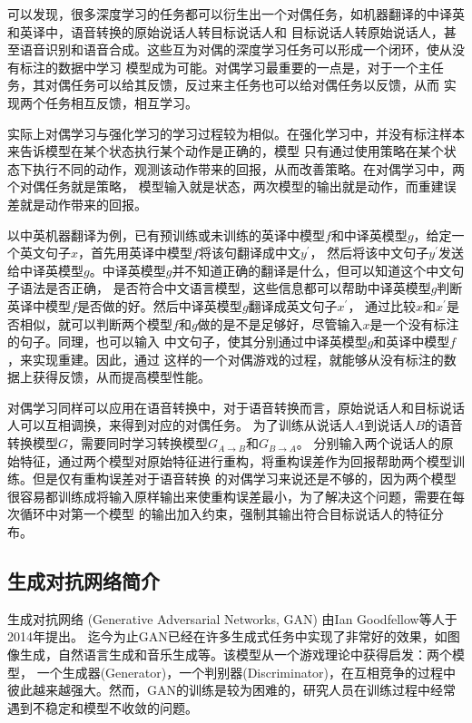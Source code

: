 可以发现，很多深度学习的任务都可以衍生出一个对偶任务，如机器翻译的中译英和英译中，语音转换的原始说话人转目标说话人和
目标说话人转原始说话人，甚至语音识别和语音合成。这些互为对偶的深度学习任务可以形成一个闭环，使从没有标注的数据中学习
模型成为可能。对偶学习最重要的一点是，对于一个主任务，其对偶任务可以给其反馈，反过来主任务也可以给对偶任务以反馈，从而
实现两个任务相互反馈，相互学习。

实际上对偶学习与强化学习的学习过程较为相似。在强化学习中，并没有标注样本来告诉模型在某个状态执行某个动作是正确的，模型
只有通过使用策略在某个状态下执行不同的动作，观测该动作带来的回报，从而改善策略。在对偶学习中，两个对偶任务就是策略，
模型输入就是状态，两次模型的输出就是动作，而重建误差就是动作带来的回报。

以中英机器翻译为例，已有预训练或未训练的英译中模型$f$和中译英模型$g$，给定一个英文句子$x$，首先用英译中模型$f$将该句翻译成中文$y^{'}$，
然后将该中文句子$y^{'}$发送给中译英模型$g$。中译英模型$g$并不知道正确的翻译是什么，但可以知道这个中文句子语法是否正确，
是否符合中文语言模型，这些信息都可以帮助中译英模型$g$判断英译中模型$f$是否做的好。然后中译英模型$g$翻译成英文句子$x^{'}$，
通过比较$x$和$x^{'}$是否相似，就可以判断两个模型$f$和$g$做的是不是足够好，尽管输入$x$是一个没有标注的句子。同理，也可以输入
中文句子，使其分别通过中译英模型$g$和英译中模型$f$，来实现重建。因此，通过
这样的一个对偶游戏的过程，就能够从没有标注的数据上获得反馈，从而提高模型性能。

对偶学习同样可以应用在语音转换中，对于语音转换而言，原始说话人和目标说话人可以互相调换，来得到对应的对偶任务。
为了训练从说话人$A$到说话人$B$的语音转换模型$G$，需要同时学习转换模型$G_{A\rightarrow B}$和$G_{B\rightarrow A}$。
分别输入两个说话人的原始特征，通过两个模型对原始特征进行重构，将重构误差作为回报帮助两个模型训练。但是仅有重构误差对于语音转换
的对偶学习来说还是不够的，因为两个模型很容易都训练成将输入原样输出来使重构误差最小，为了解决这个问题，需要在每次循环中对第一个模型
的输出加入约束，强制其输出符合目标说话人的特征分布。

\subsection{生成对抗网络简介}
生成对抗网络 (Generative Adversarial Networks, GAN) 由Ian Goodfellow等人于2014年提出\cite{goodfellow2014generative}。
迄今为止GAN已经在许多生成式任务中实现了非常好的效果，如图像生成，自然语言生成和音乐生成等。该模型从一个游戏理论中获得启发：两个模型，
一个生成器(Generator)，一个判别器(Discriminator)，在互相竞争的过程中彼此越来越强大。然而，GAN的训练是较为困难的，研究人员在训练过程中经常遇到不稳定和模型不收敛的问题。

